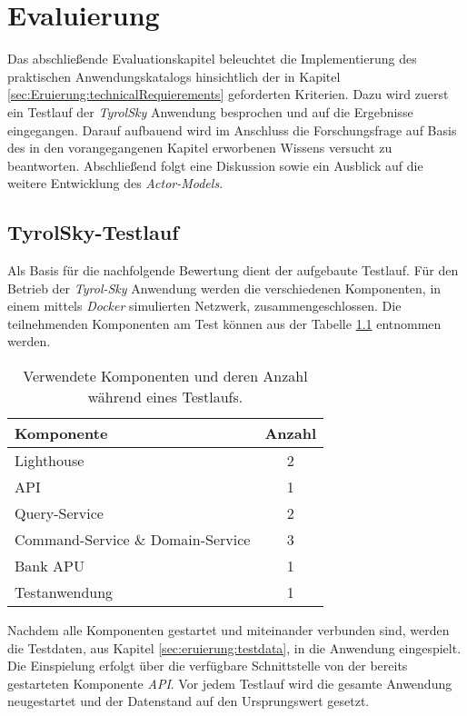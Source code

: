 \chapter{Evaluierung} 
\label{cha:evaluation}
Das abschließende Evaluationskapitel beleuchtet die Implementierung des praktischen Anwendungskatalogs hinsichtlich der in Kapitel \ref{sec:Eruierung:technicalRequierements} geforderten Kriterien. Dazu wird zuerst ein Testlauf der \textit{TyrolSky} Anwendung besprochen und auf die Ergebnisse eingegangen. Darauf aufbauend wird im Anschluss die Forschungsfrage auf Basis des in den vorangegangenen Kapitel erworbenen Wissens versucht zu beantworten. Abschließend folgt eine Diskussion sowie ein Ausblick auf die weitere Entwicklung des \textit{Actor-Models}. 

\section{TyrolSky-Testlauf}
Als Basis für die nachfolgende Bewertung dient der aufgebaute Testlauf. Für den Betrieb der \textit{Tyrol-Sky} Anwendung werden die verschiedenen Komponenten, in einem mittels \textit{Docker} simulierten Netzwerk, zusammengeschlossen. Die teilnehmenden Komponenten am Test können aus der Tabelle \ref{tab:evaluation:testStage} entnommen werden. \\
\begin{table}
  \centering
  \begin{tabular}{lc}
    Komponente    &  Anzahl \\ \hline
    Lighthouse    &  2    \\
    API       &  1    \\
    Query-Service  &  2    \\
    Command-Service \& Domain-Service &  3    \\
    Bank APU     &  1    \\
    Testanwendung  &  1
  \end{tabular}
  \caption{Verwendete Komponenten und deren Anzahl während eines Testlaufs.}
  \label{tab:evaluation:testStage}
\end{table}
Nachdem alle Komponenten gestartet und miteinander verbunden sind, werden die Testdaten, aus Kapitel \ref{sec:eruierung:testdata}, in die Anwendung eingespielt. Die Einspielung erfolgt über die verfügbare Schnittstelle von der bereits gestarteten Komponente \textit{API}. Vor jedem Testlauf wird die gesamte Anwendung neugestartet und der Datenstand auf den Ursprungswert gesetzt. \\

